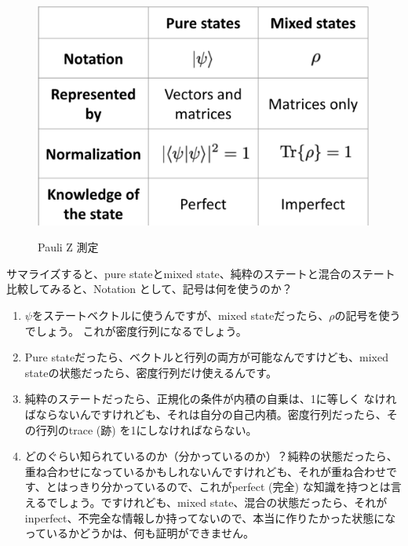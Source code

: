 \begin{figure}[H]
    \centering
    \includegraphics[width=1.0\textwidth]{lesson3/summary_table.pdf}
    \label{fig: 1}
    \begin{center}
        \caption{Pauli Z 測定}
    \end{center}
\end{figure}

サマライズすると、pure stateとmixed state、純粋のステートと混合のステート
比較してみると、Notation として、記号は何を使うのか？
\begin{enumerate}
    \item $\psi$をステートベクトルに使うんですが、mixed stateだったら、$\rho$の記号を使うでしょう。 これが密度行列になるでしょう。
    \item Pure stateだったら、ベクトルと行列の両方が可能なんですけども、mixed stateの状態だったら、密度行列だけ使えるんです。
    \item 純粋のステートだったら、正規化の条件が内積の自乗は、1に等しく なければならないんですけれども、それは自分の自己内積。密度行列だったら、その行列のtrace (跡) を1にしなければならない。
    \item どのぐらい知られているのか（分かっているのか）？純粋の状態だったら、重ね合わせになっているかもしれないんですけれども、それが重ね合わせです、とはっきり分かっているので、これがperfect (完全) な知識を持つとは言えるでしょう。ですけれども、mixed state、混合の状態だったら、それがinperfect、不完全な情報しか持ってないので、本当に作りたかった状態になっているかどうかは、何も証明ができません。
\end{enumerate}

